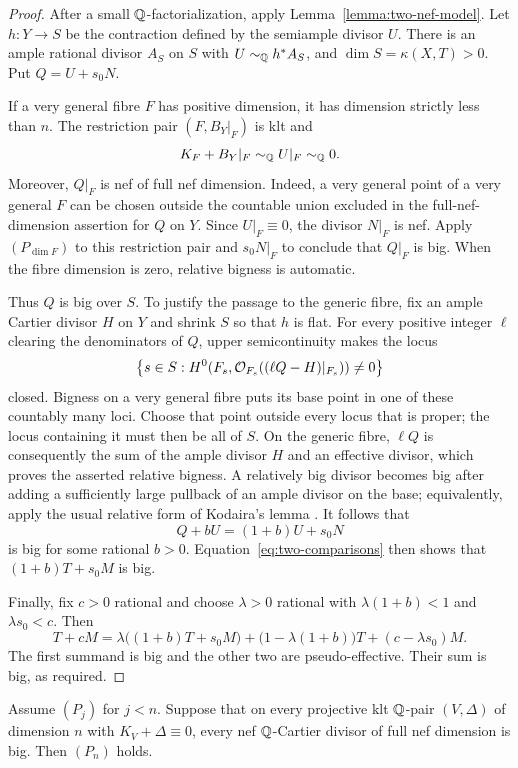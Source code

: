 \begin{proof}
After a small $\mathbb Q$-factorialization, apply
Lemma~\ref{lemma:two-nef-model}.  Let $h\colon Y\to S$ be the
contraction defined by the semiample divisor $U$.  There is an ample
rational divisor $A_S$ on $S$ with $U\sim_\mathbb Q h^*A_S$, and
$\dim S=\kappa(X,T)>0$.  Put $Q=U+s_0N$.

If a very general fibre $F$ has positive dimension, it has dimension
strictly less than $n$.  The restriction pair $(F,B_Y|_F)$ is klt
and
\[
                    K_F+B_Y|_F\sim_\mathbb Q U|_F\sim_\mathbb Q0.
\]
Moreover, $Q|_F$ is nef of full nef dimension.  Indeed, a very general
point of a very general $F$ can be chosen outside the countable union
excluded in the full-nef-dimension assertion for $Q$ on $Y$.
Since $U|_F\equiv0$, the divisor $N|_F$ is nef.  Apply $(P_{\dim F})$
to this restriction pair and $s_0N|_F$ to conclude that $Q|_F$ is big.
When the fibre dimension is zero, relative bigness is automatic.

Thus $Q$ is big over $S$.  To justify the passage to the generic
fibre, fix an ample Cartier divisor $H$ on $Y$ and shrink $S$ so
that $h$ is flat.  For every positive integer $\ell$ clearing the
denominators of $Q$, upper semicontinuity makes the locus
\[
        \bigl\{s\in S:
        H^0(F_s,\mathcal O_{F_s}((\ell Q-H)|_{F_s}))\ne0\bigr\}
\]
closed.  Bigness on a very general fibre puts its base point in one
of these countably many loci.  Choose that point outside every
locus that is proper; the locus containing it must then be all of
$S$.  On the generic fibre, $\ell Q$ is consequently the sum of
the ample divisor $H$ and an effective divisor, which proves the
asserted relative bigness.  A relatively big divisor becomes big after adding
a sufficiently large pullback of an ample divisor on the base;
equivalently, apply the usual relative form of Kodaira's lemma
\cite[Lemma 3.2.1]{BCHM}.  It follows that
\[
                         Q+bU=(1+b)U+s_0N
\]
is big for some rational $b>0$.  Equation~\eqref{eq:two-comparisons}
then shows that $(1+b)T+s_0M$ is big.

Finally, fix $c>0$ rational and choose $\lambda>0$ rational with
$\lambda(1+b)<1$ and $\lambda s_0<c$.  Then
\[
 T+cM=\lambda\bigl((1+b)T+s_0M\bigr)
       +\bigl(1-\lambda(1+b)\bigr)T+(c-\lambda s_0)M.
\]
The first summand is big and the other two are pseudo-effective.
Their sum is big, as required.
\end{proof}

\begin{proposition}\label{prop:reduction-cy}
Assume $(P_j)$ for $j<n$.  Suppose that on every projective klt
$\mathbb Q$-pair $(V,\Delta)$ of dimension $n$ with
$K_V+\Delta\equiv0$, every nef $\mathbb Q$-Cartier divisor of full nef
dimension is big.  Then $(P_n)$ holds.
\end{proposition}

